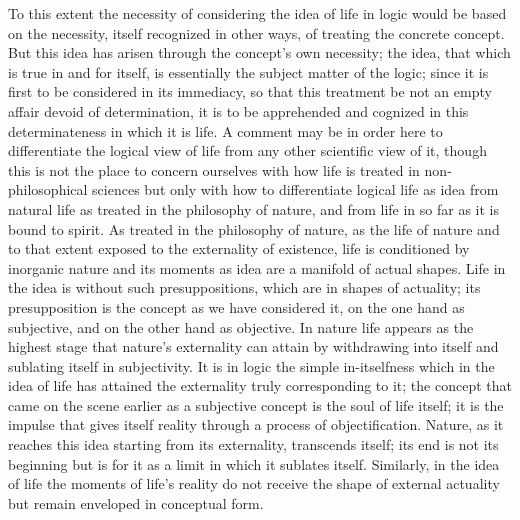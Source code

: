 To this extent the necessity of considering
the idea of life in logic would be based on
the necessity, itself recognized in other ways,
of treating the concrete concept.
But this idea has arisen through the concept's own necessity;
the idea, that which is true in and for itself,
is essentially the subject matter of the logic;
since it is first to be considered in its immediacy,
so that this treatment be not
an empty affair devoid of determination,
it is to be apprehended and cognized
in this determinateness in which it is life.
A comment may be in order here to
differentiate the logical view of life
from any other scientific view of it,
though this is not the place to concern
ourselves with how life is treated in non-philosophical sciences
but only with how to differentiate logical life as idea
from natural life as treated in the philosophy of nature,
and from life in so far as it is bound to spirit.
As treated in the philosophy of nature,
as the life of nature and to that extent
exposed to the externality of existence,
life is conditioned by inorganic nature
and its moments as idea are a manifold of actual shapes.
Life in the idea is without such presuppositions,
which are in shapes of actuality;
its presupposition is the concept
as we have considered it,
on the one hand as subjective,
and on the other hand as objective.
In nature life appears as the highest stage
that nature's externality can attain
by withdrawing into itself
and sublating itself in subjectivity.
It is in logic the simple in-itselfness
which in the idea of life has attained
the externality truly corresponding to it;
the concept that came on the scene earlier as
a subjective concept is the soul of life itself;
it is the impulse that gives itself reality
through a process of objectification.
Nature, as it reaches this idea
starting from its externality, transcends itself;
its end is not its beginning but is for it
as a limit in which it sublates itself.
Similarly, in the idea of life
the moments of life's reality do not
receive the shape of external actuality
but remain enveloped in conceptual form.

